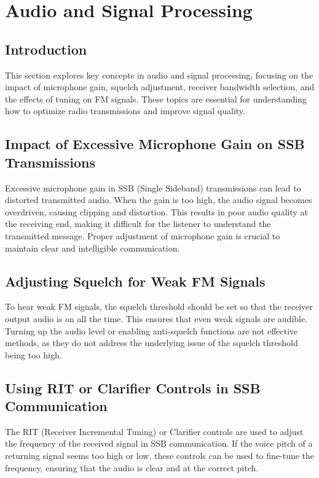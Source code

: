 \section{Audio and Signal Processing}
\label{section:audio_and_signal_processing}

\subsection*{Introduction}
This section explores key concepts in audio and signal processing, focusing on the impact of microphone gain, squelch adjustment, receiver bandwidth selection, and the effects of tuning on FM signals. These topics are essential for understanding how to optimize radio transmissions and improve signal quality.

\subsection*{Impact of Excessive Microphone Gain on SSB Transmissions}
Excessive microphone gain in SSB (Single Sideband) transmissions can lead to distorted transmitted audio. When the gain is too high, the audio signal becomes overdriven, causing clipping and distortion. This results in poor audio quality at the receiving end, making it difficult for the listener to understand the transmitted message. Proper adjustment of microphone gain is crucial to maintain clear and intelligible communication.

\subsection*{Adjusting Squelch for Weak FM Signals}
To hear weak FM signals, the squelch threshold should be set so that the receiver output audio is on all the time. This ensures that even weak signals are audible. Turning up the audio level or enabling anti-squelch functions are not effective methods, as they do not address the underlying issue of the squelch threshold being too high.

\subsection*{Using RIT or Clarifier Controls in SSB Communication}
The RIT (Receiver Incremental Tuning) or Clarifier controls are used to adjust the frequency of the received signal in SSB communication. If the voice pitch of a returning signal seems too high or low, these controls can be used to fine-tune the frequency, ensuring that the audio is clear and at the correct pitch.

